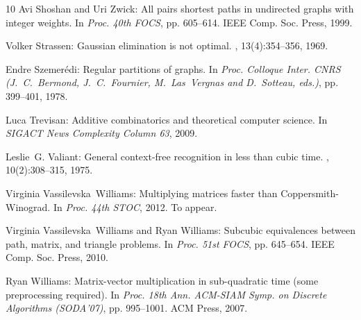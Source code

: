 \begin{thebibliography}{10}
{\sc Avi Shoshan and Uri Zwick}: All pairs shortest paths in undirected graphs
  with integer weights.
\newblock In {\em Proc. 40th FOCS}, pp. 605--614. IEEE Comp. Soc. Press, 1999.

{\sc Volker Strassen}: {G}aussian elimination is not optimal.
, 13(4):354--356, 1969.
\newblock [\epfmtdoi{10.1007/BF02165411}]

{\sc Endre Szemer\'edi}: Regular partitions of graphs.
\newblock In {\em Proc. Colloque Inter. CNRS (J.~C.~Bermond, J.~C.~Fournier,
  M.~Las~Vergnas and D.~Sotteau, eds.)}, pp. 399--401, 1978.

{\sc Luca Trevisan}: Additive combinatorics and theoretical computer science.
\newblock In {\em SIGACT News Complexity Column 63}, 2009.

{\sc Leslie~G. Valiant}: General context-free recognition in less than cubic
  time.
, 10(2):308--315, 1975.
\newblock [\epfmtdoi{10.1016/S0022-0000(75)80046-8}]

{\sc Virginia Vassilevska~Williams}: Multiplying matrices faster than
  {C}oppersmith-{W}inograd.
\newblock In {\em Proc. 44th STOC}, 2012.
\newblock To appear.

{\sc Virginia Vassilevska~Williams and Ryan Williams}: Subcubic equivalences
  between path, matrix, and triangle problems.
\newblock In {\em Proc. 51st FOCS}, pp. 645--654. IEEE Comp. Soc. Press, 2010.

{\sc Ryan Williams}: Matrix-vector multiplication in sub-quadratic time (some
  preprocessing required).
\newblock In {\em Proc. 18th Ann. ACM-SIAM Symp. on Discrete Algorithms
  (SODA'07)}, pp. 995--1001. ACM Press, 2007.

\end{thebibliography}
